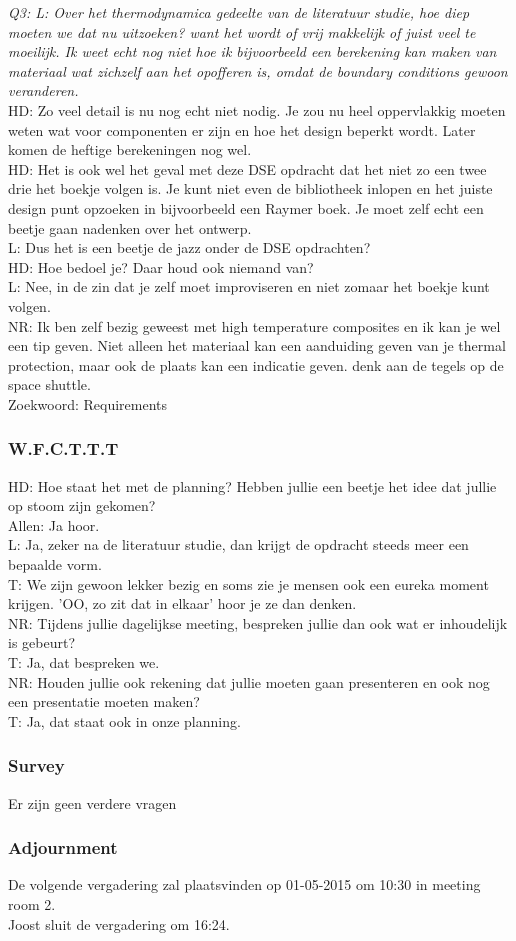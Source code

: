 \textit{Q3: L: Over het thermodynamica gedeelte van de literatuur studie, hoe diep moeten we dat nu uitzoeken? want het wordt of vrij makkelijk of juist veel te moeilijk. Ik weet echt nog niet hoe ik bijvoorbeeld een berekening kan maken van materiaal wat zichzelf aan het opofferen is, omdat de boundary conditions gewoon veranderen.}\\
HD: Zo veel detail is nu nog echt niet nodig. Je zou nu heel oppervlakkig moeten weten wat voor componenten er zijn en hoe het design beperkt wordt. Later komen de heftige berekeningen nog wel.\\
HD: Het is ook wel het geval met deze DSE opdracht dat het niet zo een twee drie het boekje volgen is. Je kunt niet even de bibliotheek inlopen en het juiste design punt opzoeken in bijvoorbeeld een Raymer boek. Je moet zelf echt een beetje gaan nadenken over het ontwerp.\\
L: Dus het is een beetje de jazz onder de DSE opdrachten?\\
HD: Hoe bedoel je? Daar houd ook niemand van?\\
L: Nee, in de zin dat je zelf moet improviseren en niet zomaar het boekje kunt volgen.\\
NR: Ik ben zelf bezig geweest met high temperature composites en ik kan je wel een tip geven. Niet alleen het materiaal kan een aanduiding geven van je thermal protection, maar ook de plaats kan een indicatie geven. denk aan de tegels op de space shuttle.\\

Zoekwoord: Requirements\\

\subsubsection{W.F.C.T.T.T}
HD: Hoe staat het met de planning? Hebben jullie een beetje het idee dat jullie op stoom zijn gekomen?\\
Allen: Ja hoor.\\
L: Ja, zeker na de literatuur studie, dan krijgt de opdracht steeds meer een bepaalde vorm.\\
T: We zijn gewoon lekker bezig en soms zie je mensen ook een eureka moment krijgen. 'OO, zo zit dat in elkaar' hoor je ze dan denken.\\

NR: Tijdens jullie dagelijkse meeting, bespreken jullie dan ook wat er inhoudelijk is gebeurt?\\
T: Ja, dat bespreken we.\\
NR: Houden jullie ook rekening dat jullie moeten gaan presenteren en ook nog een presentatie moeten maken?\\
T: Ja, dat staat ook in onze planning.

\subsubsection{Survey}
Er zijn geen verdere vragen

\subsubsection{Adjournment}
De volgende vergadering zal plaatsvinden op 01-05-2015 om 10:30 in meeting room 2.\\

Joost sluit de vergadering om 16:24.\\
